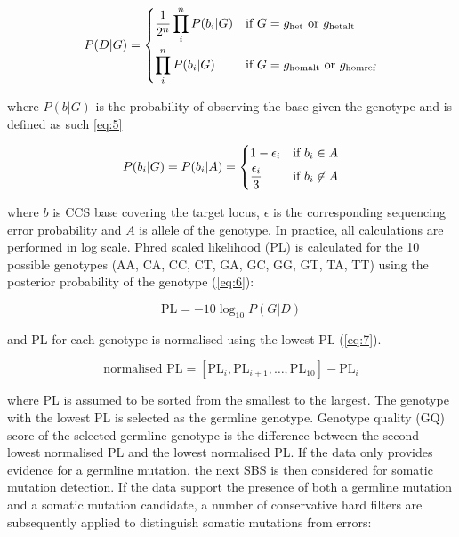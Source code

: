\begin{equation} \label{eq:4}
P(D|G) =  
	\begin{dcases}
    	\frac{1}{2^n}\prod_{i}^{n} P(b_{i}|G) & \text{if } G = g_{\text{het}} \text{ or } g_{\text{hetalt}} \\
	    \prod_{i}^{n} P(b_{i}|G) & \text{if } G = g_{\text{homalt}} \text{ or } g_{\text{homref}} \\
	\end{dcases}
\end{equation}

where $P(b|G)$ is the probability of observing the base given the genotype and is defined as such \ref{eq:5}

\begin{equation} \label{eq:5}
P(b_{i}|G) = P(b_{i}|A) = 
	\begin{dcases}
    	1 - \epsilon_{i} & \text{if } b_{i} \in A \\
	    \frac{\epsilon_{i}}{3} & \text{if } b_{i} \not\in A \\
	\end{dcases} \smallskip
\end{equation}

where $b$ is CCS base covering the target locus, $\epsilon$ is the corresponding sequencing error probability and $A$ is allele of the genotype. In practice, all calculations are performed in log scale. Phred scaled likelihood (PL) is calculated for the 10 possible genotypes (AA, CA, CC, CT, GA, GC, GG, GT, TA, TT) using the posterior probability of the genotype (\ref{eq:6}):

\begin{equation} \label{eq:6}
\text{PL} = -10\log_{10}P(G|D) 
\end{equation}

and PL for each genotype is normalised using the lowest PL (\ref{eq:7}).

\begin{equation} \label{eq:7}
\text{normalised PL} = [\text{PL}_{i}, \text{PL}_{i+1}, \ldots, \text{PL}_{10}] - \text{PL}_{i}
\end{equation}

where PL is assumed to be sorted from the smallest to the largest. The genotype with the lowest PL is selected as the germline genotype. Genotype quality (GQ) score of the selected germline genotype is the difference between the second lowest normalised PL and the lowest normalised PL. If the data only provides evidence for a germline mutation, the next SBS is then considered for somatic mutation detection. If the data support the presence of both a germline mutation and a somatic mutation candidate, a number of conservative hard filters are subsequently applied to distinguish somatic mutations from errors:

